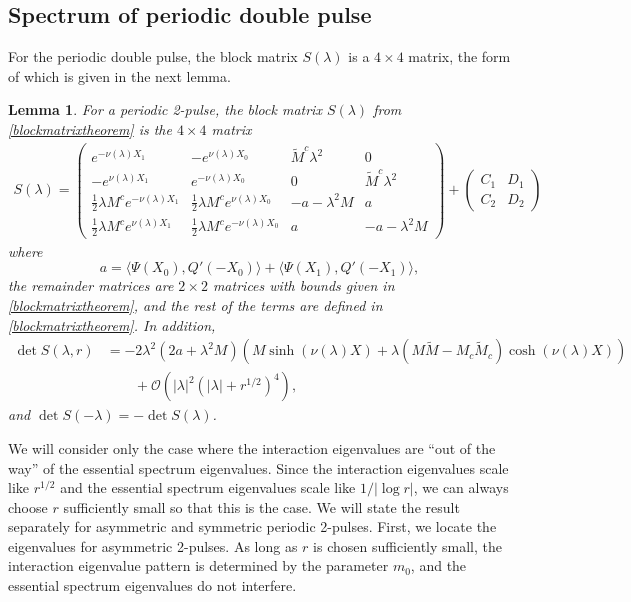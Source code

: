 \documentclass[10pt,reqno]{amsart}
\theoremstyle{plain}
\newtheorem{lemma}[theorem]{Lemma}
\theoremstyle{definition}
\theoremstyle{remark}
\numberwithin{theorem}{section}
\numberwithin{equation}{section}
\begin{document}
\subsection{Spectrum of periodic double pulse}\label{sec:perdouble}

For the periodic double pulse, the block matrix $S(\lambda)$ is a $4\times 4$ matrix, the form of which is given in the next lemma.

\begin{lemma}\label{lemmma:2pblockmatrix}
For a periodic 2-pulse, the block matrix $S(\lambda)$ from \cref{blockmatrixtheorem} is the $4 \times 4$ matrix
\begin{align}\label{dpSmatrix}
S(\lambda) = 
\begin{pmatrix}
e^{-\nu(\lambda)X_1} & -e^{\nu(\lambda)X_0} & \tilde{M}^c \lambda^2 & 0 \\
-e^{\nu(\lambda)X_1} & e^{-\nu(\lambda)X_0} & 0 & \tilde{M}^c \lambda^2 \\
\frac{1}{2}\lambda M^c e^{-\nu(\lambda)X_1} & \frac{1}{2}\lambda M^ce^{\nu(\lambda)X_0} &-a-\lambda^2 M & a \\
\frac{1}{2}\lambda M^c e^{\nu(\lambda)X_1} & \frac{1}{2}\lambda M^c e^{-\nu(\lambda)X_0}  & a & -a-\lambda^2 M
\end{pmatrix}
+ \begin{pmatrix} C_1 & D_1 \\ C_2 & D_2 \end{pmatrix}
\end{align}
where
\begin{equation}\label{2pa}
a = \langle \Psi(X_0), Q'(-X_0) \rangle + \langle \Psi(X_1), Q'(-X_1) \rangle,
\end{equation}
the remainder matrices are $2\times2$ matrices with bounds given in \cref{blockmatrixtheorem}, and the rest of the terms are defined in \cref{blockmatrixtheorem}. In addition,
\begin{equation}\label{2pblockmatrixdet}
\begin{aligned}
\det S(\lambda, r) &= -2 \lambda^2 (2a + \lambda^2 M)\left( M \sinh(\nu(\lambda)X) + \lambda(M \tilde{M} - M_c \tilde{M}_c)\cosh(\nu(\lambda)X) \right) \\
&\qquad+ \mathcal{O}\left(|\lambda|^2(|\lambda| + r^{1/2})^4\right),
\end{aligned}
\end{equation}
and $\det S(-\lambda) = -\det S(\lambda)$.
\end{lemma}

We will consider only the case where the interaction eigenvalues are ``out of the way'' of the essential spectrum eigenvalues. Since the interaction eigenvalues scale like $r^{1/2}$ and the essential spectrum eigenvalues scale like $1/|\log r|$, we can always choose $r$ sufficiently small so that this is the case. We will state the result separately for asymmetric and symmetric periodic 2-pulses. First, we locate the eigenvalues for asymmetric 2-pulses. As long as $r$ is chosen sufficiently small, the interaction eigenvalue pattern is determined by the parameter $m_0$, and the essential spectrum eigenvalues do not interfere.
\end{document}
